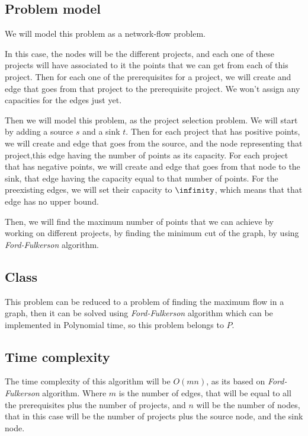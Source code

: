 \documentclass{article}
\begin{document}
\subsection*{Problem model}

We will model this problem as a network-flow problem.

In this case, the nodes will be the different projects, and each one of these projects will have associated to it the points that we can get from each of this project. Then for each one of the prerequisites for a project, we will create and edge that goes from that project to the prerequisite project. We won't assign any capacities for the edges just yet.

Then we will model this problem, as the project selection problem. We will start by adding a source $s$ and a sink $t$. Then for each project that has positive points, we will create and edge that goes from the source, and the node representing that project,this edge having the number of points as its capacity. For each project that has negative points, we will create and edge that goes from that node to the sink, that edge having the capacity equal to that number of points. For the preexisting edges, we will set their capacity to $\infinity$, which means that that edge has no upper bound.

Then, we will find the maximum number of points that we can achieve by working on different projects, by finding the minimum cut of the graph, by using \textit{Ford-Fulkerson} algorithm.

\subsection*{Class}

This problem can be reduced to a problem of finding the maximum flow in a graph, then it can be solved using \textit{Ford-Fulkerson} algorithm which can be implemented in Polynomial time, so this problem belongs to $P$.


\subsection*{Time complexity}

The time complexity of this algorithm will be $O(mn)$, as its based on \textit{Ford-Fulkerson} algorithm. Where $m$ is the number of edges, that will be equal to all the prerequisites plus the number of projects, and $n$ will be the number of nodes, that in this case will be the number of projects plus the source node, and the sink node.
\end{document}
